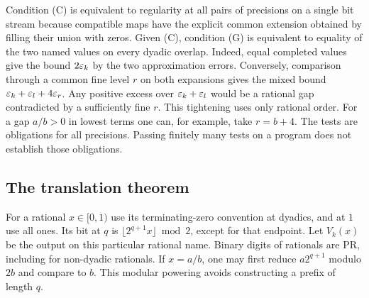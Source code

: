 Condition (C) is equivalent to regularity at all pairs of precisions on a single bit stream because compatible maps have the explicit common extension obtained by filling their union with zeros. Given (C), condition (G) is equivalent to equality of the two named values on every dyadic overlap. Indeed, equal completed values give the bound $2\varepsilon_k$ by the two approximation errors. Conversely, comparison through a common fine level $r$ on both expansions gives the mixed bound $\varepsilon_k+\varepsilon_l+4\varepsilon_r$. Any positive excess over $\varepsilon_k+\varepsilon_l$ would be a rational gap contradicted by a sufficiently fine $r$. This tightening uses only rational order. For a gap $a/b>0$ in lowest terms one can, for example, take $r=b+4$. The tests are obligations for all precisions. Passing finitely many tests on a program does not establish those obligations.

\subsection{The translation theorem}
For a rational $x\in[0,1)$ use its terminating-zero convention at dyadics, and at $1$ use all ones. Its bit at $q$ is $\lfloor 2^{q+1}x\rfloor\bmod 2$, except for that endpoint. Let $V_k(x)$ be the output on this particular rational name. Binary digits of rationals are PR, including for non-dyadic rationals. If $x=a/b$, one may first reduce $a2^{q+1}$ modulo $2b$ and compare to $b$. This modular powering avoids constructing a prefix of length $q$.

